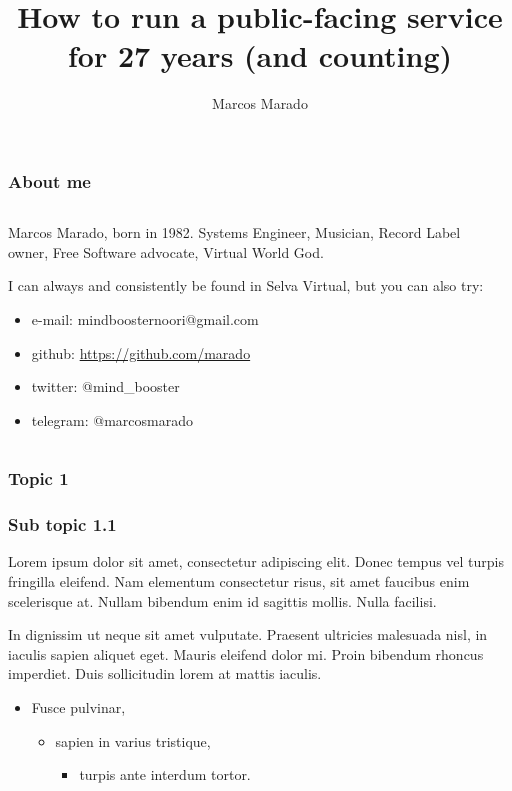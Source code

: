 \documentclass[aspectratio=169]{beamer}
\title{How to run a public-facing service for 27 years (and counting)}
\author{Marcos Marado}
\begin{document}
\frame[plain]{\titlepage}
 
\begin{frame}
\frametitle{About me}
\begin{columns}[T]
\begin{column}{.5\textwidth}
\begin{block}{Marcos Marado, born in 1982. Systems Engineer, Musician, Record Label owner, Free Software advocate, Virtual World God.}

I can always and consistently be found in Selva Virtual, but you can also try:

\begin{itemize}
\item{} e-mail: mindboosternoori@gmail.com
\item{} github: \url{https://github.com/marado}
\item{} twitter: @mind\_booster
\item{} telegram: @marcosmarado
\end{itemize}
\end{block}
\end{column}
\begin{column}{.5\textwidth}
\begin{center}





\end{center}
\end{column}
\end{columns}
\end{frame}

\begin{frame}
\frametitle{Topic 1}
\end{frame}

\begin{frame}
\frametitle{Sub topic 1.1}

Lorem ipsum dolor sit amet, consectetur adipiscing elit.
Donec tempus vel turpis fringilla eleifend.
Nam elementum consectetur risus, sit amet faucibus enim scelerisque at.
Nullam bibendum enim id sagittis mollis. Nulla facilisi.

In dignissim ut neque sit amet vulputate.
Praesent ultricies malesuada nisl, in iaculis sapien aliquet eget.
Mauris eleifend dolor mi. Proin bibendum rhoncus imperdiet.
Duis sollicitudin lorem at mattis iaculis.

\begin{itemize}
	\item{} Fusce pulvinar,
	\begin{itemize}
		\item{} sapien in varius tristique,
		\begin{itemize}
        		\item{} turpis ante interdum tortor.
		\end{itemize}
	\end{itemize}
\end{itemize}

\end{frame}
\end{document}
